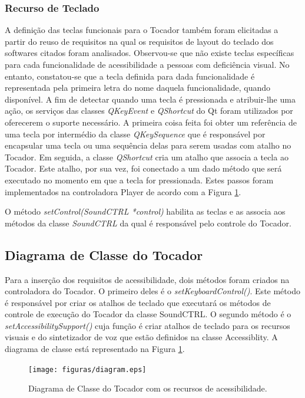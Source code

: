 \subsubsection{Recurso de Teclado}

A definição das teclas funcionais para o Tocador também foram elicitadas a partir do reuso de requisitos na qual os requisitos de layout do teclado dos softwares citados foram analisados. Observou-se que não existe teclas específicas para cada funcionalidade de acessibilidade a pessoas com deficiência visual. No entanto, constatou-se que a tecla definida para dada funcionalidade é representada pela primeira letra do nome daquela funcionalidade, quando disponível. A fim de detectar quando uma tecla é pressionada e atribuir-lhe uma ação, os serviços das classes \textit{QKeyEvent} e \textit{QShortcut} do Qt foram utilizados por oferecerem o suporte necessário. A primeira coisa feita foi obter um referência de uma tecla por intermédio da classe \textit{QKeySequence} que é responsável por encapsular uma tecla ou uma sequência delas para serem usadas com atalho no Tocador. Em seguida, a classe \textit{QShortcut} cria um atalho que associa a tecla ao Tocador. Este atalho, por sua vez, foi conectado a um dado método que será executado no momento em que a tecla for pressionada. Estes passos foram implementados na controladora Player de acordo com a Figura \ref{diagram}.

O método \textit{setControl(SoundCTRL *control)} habilita as teclas e as associa aos métodos da classe \textit{SoundCTRL} da qual é responsável pelo controle do Tocador.

\subsection{Diagrama de Classe do Tocador}

Para a inserção dos requisitos de acessibilidade, dois métodos foram criados na controladora do Tocador. O primeiro deles é o \textit{setKeyboardControl()}. Este método é responsável por criar os atalhos de teclado que executará os métodos de controle de execução do Tocador da classe SoundCTRL. O segundo método é o \textit{setAccessibilitySupport()} cuja função é criar atalhos de teclado para os recursos visuais e do sintetizador de voz que estão definidos na classe Accessiblity. A diagrama de classe está representado na Figura \ref{diagram}.

\begin{figure}[ht]
	\centering
		\texttt{[image: figuras/diagram.eps]}
	\caption{Diagrama de Classe do Tocador com os recursos de acessibilidade.}
	\label{diagram}
\end{figure}

